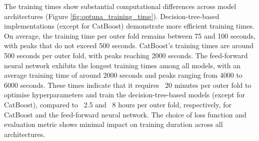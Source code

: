 \documentclass[nhess, manuscript]{copernicus}
\begin{document}
The training times show substantial computational differences across model architectures (Figure \ref{fig:optuna_training_time}). Decision-tree-based implementations (except for CatBoost) demonstrate more efficient training times. On average, the training time per outer fold remains between 75 and 100 seconds, with peaks that do not exceed 500 seconds. CatBoost's training times are around 500 seconds per outer fold, with peaks reaching 2000 seconds. The feed-forward neural network exhibits the longest training times among all models, with an average training time of around 2000 seconds and peaks ranging from 4000 to 6000 seconds. These times indicate that it requires ~20 minutes per outer fold to optimise hyperparameters and train the decision-tree-based models (except for CatBoost), compared to ~2.5 and ~8 hours per outer fold, respectively, for CatBoost and the feed-forward neural network. The choice of loss function and evaluation metric shows minimal impact on training duration across all architectures.
\end{document}
